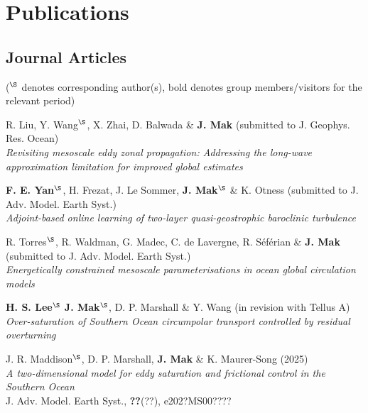 \documentclass[letterpaper]{article}
\renewenvironment{itemize}{
  \begin{list}{}{
    \setlength{\leftmargin}{1.5em}
  }
}{
  \end{list}
}
\begin{document}
\section*{Publications}
\subsection*{Journal Articles}

(${}^\S$ denotes corresponding author(s), bold denotes group members/visitors for the relevant period)

\begin{itemize}


\item[*] R. Liu, Y. Wang$^{\S}$, X. Zhai, D. Balwada \& \textbf{J. Mak} (submitted to J. Geophys. Res. Ocean)\\
\textit{Revisiting mesoscale eddy zonal propagation: Addressing the long-wave approximation limitation for improved global estimates}

\item[*] \textbf{F. E. Yan}$^{\S}$, H. Frezat, J. Le Sommer, \textbf{J. Mak}$^{\S}$ \& K. Otness (submitted to  J. Adv. Model. Earth Syst.)\\
\textit{Adjoint-based online learning of two-layer quasi-geostrophic baroclinic turbulence}

\item[*] R. Torres$^{\S}$, R. Waldman, G. Madec, C. de Lavergne, R. S\'ef\'erian \& \textbf{J. Mak} (submitted to J. Adv. Model. Earth Syst.)\\
\textit{Energetically constrained mesoscale parameterisations in ocean global circulation models}

\item[*] \textbf{H. S. Lee}$^{\S}$ \textbf{J. Mak}$^{\S}$, D. P. Marshall \& Y. Wang (in revision with Tellus A)\\
\textit{Over-saturation of Southern Ocean circumpolar transport controlled by residual overturning}

\item[25.] J. R. Maddison$^{\S}$, D. P. Marshall, \textbf{J. Mak} \& K. Maurer-Song (2025)\\
\textit{A two-dimensional model for eddy saturation and frictional control in the Southern Ocean}\\
J. Adv. Model. Earth Syst., \textbf{??}(??), e202?MS00????


\end{itemize}
\end{document}
